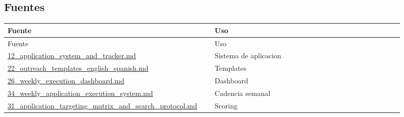 \subsection{Fuentes}


\begin{center}
\scriptsize
\begin{longtable}{>{\raggedright\arraybackslash}p{0.455\linewidth} >{\raggedright\arraybackslash}p{0.455\linewidth}}
\toprule
Fuente & Uso \\
\midrule
\endfirsthead
\toprule
Fuente & Uso \\
\midrule
\endhead
\href{file:///E:/Laboral/12_application_system_and_tracker.md}{12\_application\_system\_and\_tracker.md} & Sistema de aplicacion \\
\href{file:///E:/Laboral/22_outreach_templates_english_spanish.md}{22\_outreach\_templates\_english\_spanish.md} & Templates \\
\href{file:///E:/Laboral/26_weekly_execution_dashboard.md}{26\_weekly\_execution\_dashboard.md} & Dashboard \\
\href{file:///E:/Laboral/34_weekly_application_execution_system.md}{34\_weekly\_application\_execution\_system.md} & Cadencia semanal \\
\href{file:///E:/Laboral/31_application_targeting_matrix_and_search_protocol.md}{31\_application\_targeting\_matrix\_and\_search\_protocol.md} & Scoring \\
\bottomrule
\end{longtable}
\end{center}
